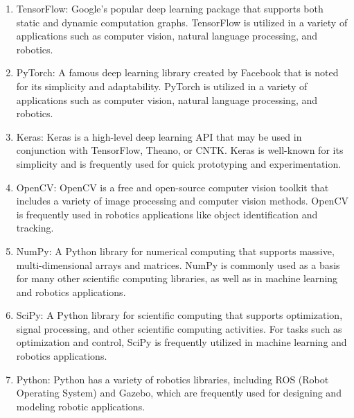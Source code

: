 \documentclass[12pt,oneside]{article}
\begin{document}
\begin{enumerate}
\item TensorFlow: Google's popular deep learning package that supports both static and dynamic computation graphs. TensorFlow is utilized in a variety of applications such as computer vision, natural language processing, and robotics.
\item PyTorch: A famous deep learning library created by Facebook that is noted for its simplicity and adaptability. PyTorch is utilized in a variety of applications such as computer vision, natural language processing, and robotics.
\item Keras: Keras is a high-level deep learning API that may be used in conjunction with TensorFlow, Theano, or CNTK. Keras is well-known for its simplicity and is frequently used for quick prototyping and experimentation.
\item OpenCV: OpenCV is a free and open-source computer vision toolkit that includes a variety of image processing and computer vision methods. OpenCV is frequently used in robotics applications like object identification and tracking.
\item NumPy: A Python library for numerical computing that supports massive, multi-dimensional arrays and matrices. NumPy is commonly used as a basis for many other scientific computing libraries, as well as in machine learning and robotics applications.
\item SciPy: A Python library for scientific computing that supports optimization, signal processing, and other scientific computing activities. For tasks such as optimization and control, SciPy is frequently utilized in machine learning and robotics applications.
\item Python: Python has a variety of robotics libraries, including ROS (Robot Operating System) and Gazebo, which are frequently used for designing and modeling robotic applications.
\end{enumerate}
\end{document}

